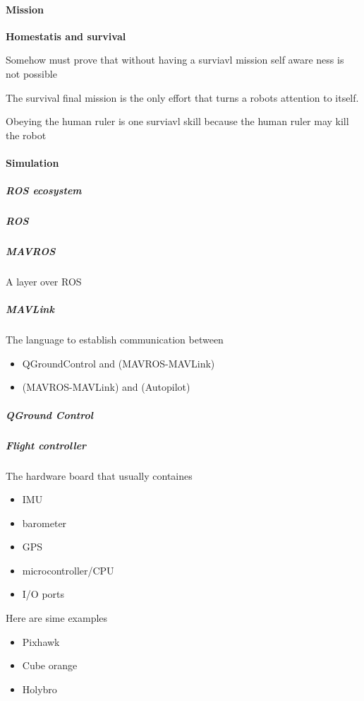 \documentclass{book}
\providecommand{\ProjectDeepHeading}[2]{%
    \par\medskip\noindent\textbf{#2}\par\smallskip
}
\begin{document}
\paragraph{Mission}
    \ProjectDeepHeading{2}{Homestatis and survival}
        Somehow must prove that without having a surviavl mission self aware ness is not possible
        
        The survival final mission is the only effort that turns a robots attention to itself.
        
        Obeying the human ruler is one surviavl skill because the human ruler may kill the robot


        
\paragraph{Simulation}
    \subparagraph{ROS ecosystem}
    
    
    \subparagraph{ROS}
    
    
    \subparagraph{MAVROS}
    A layer over ROS
    
    
    \subparagraph{MAVLink}
    The language to establish communication between
    \begin{itemize}
        \item QGroundControl and (MAVROS-MAVLink)
        \item (MAVROS-MAVLink) and (Autopilot)
    \end{itemize}
    
    
    \subparagraph{QGround Control}
    
    
    \subparagraph{Flight controller}
    The hardware board that usually containes
    \begin{itemize}
        \item IMU
        \item barometer
        \item GPS
        \item microcontroller/CPU
        \item I/O ports
    \end{itemize}
    
    Here are sime examples
    \begin{itemize}
        \item Pixhawk
        \item Cube orange
        \item Holybro
    \end{itemize}
    
\end{document}
